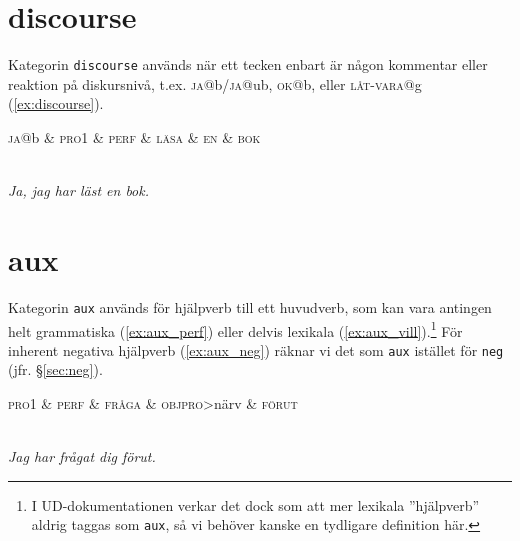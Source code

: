 \documentclass[11pt,a4paper]{article}
\begin{document}


\section{discourse}
Kategorin \texttt{discourse} används när ett tecken enbart är någon kommentar eller reaktion på diskursnivå, t.ex. \textsc{ja}@b/\textsc{ja}@ub, \textsc{ok}@b, eller \textsc{låt-vara}@g (\ref{ex:discourse}).

\begin{example}
\label{ex:discourse}
\begin{dependency}[theme = simple]
   \begin{deptext}[column sep=1em]
    \textsc{ja}@b \&  \textsc{pro1} \& \textsc{perf} \& \textsc{läsa} \& \textsc{en} \& \textsc{bok} \\
   \end{deptext}
   \end{dependency}
\\
\textit{Ja, jag har läst en bok.}
\end{example}

\section{aux}
Kategorin \texttt{aux} används för hjälpverb till ett huvudverb, som kan vara antingen helt grammatiska (\ref{ex:aux_perf}) eller delvis lexikala (\ref{ex:aux_vill}).\footnote{I UD-dokumentationen verkar det dock som att mer lexikala ''hjälpverb'' aldrig taggas som \texttt{aux}, så vi behöver kanske en tydligare definition här.} För inherent negativa hjälpverb (\ref{ex:aux_neg}) räknar vi det som \texttt{aux} istället för \texttt{neg} (jfr. §\ref{sec:neg}).

\begin{example}
\label{ex:aux_perf}
\begin{dependency}[theme = simple]
   \begin{deptext}[column sep=1em]
      \textsc{pro1} \& \textsc{perf} \& \textsc{fråga} \& \textsc{objpro}{\textgreater}närv \& \textsc{förut} \\
   \end{deptext}
\end{dependency}
\\
\textit{Jag har frågat dig förut.}
\end{example}
\end{document}
